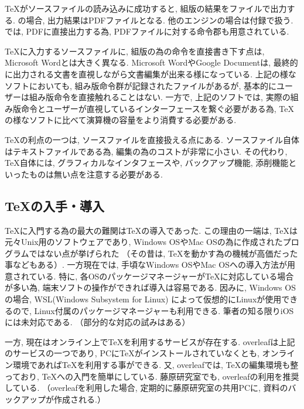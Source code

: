 \documentclass[12pt,xelatex,ja=standard]{bxjsarticle}
\begin{document}
\TeX がソースファイルの読み込みに成功すると,
組版の結果をファイルで出力する.
\XeLaTeX の場合,
出力結果はPDFファイルとなる.
他のエンジンの場合は付録で扱う.
\XeLaTeX では, PDFに直接出力する為,
PDFファイルに対する命令郡も用意されている.

\TeX に入力するソースファイルに,
組版の為の命令を直接書き下す点は,
Microsoft Wordとは大きく異なる.
Microsoft WordやGoogle Documentは,
最終的に出力される文書を直視しながら文書編集が出来る様になっている.
上記の様なソフトにおいても,
組み版命令群が記録されたファイルがあるが,
基本的にユーザーは組み版命令を直接触れることはない.
一方で, 上記のソフトでは,
実際の組み版命令とユーザーが直視しているインターフェースを繋ぐ必要がある為,
\TeX の様なソフトに比べて演算機の容量をより消費する必要がある.

\TeX の利点の一つは,
ソースファイルを直接扱える点にある.
ソースファイル自体はテキストファイルである為,
編集の為のコストが非常に小さい.
その代わり,
\TeX 自体には, グラフィカルなインタフェースや,
バックアップ機能, 添削機能といったものは無い点を注意する必要がある.

\subsection{\TeX の入手・導入}
\TeX に入門する為の最大の難関は\TeX の導入であった.
この理由の一端は,
\TeX は元々Unix用のソフトウェアであり,
Windows OSやMac OSの為に作成されたプログラムではない点が挙げられた
（その昔は, \TeX を動かす為の機械が高価だった事などもある）.
一方現在では,
手頃なWindows OSやMac OSへの導入方法が用意されている.
特に, 各OSのパッケージマネージャーが\TeX に対応している場合が多い為,
端末ソフトの操作ができれば導入は容易である.
因みに, Windows OSの場合,
WSL(Windows Subsystem for Linux)
によって仮想的にLinuxが使用できるので,
Linux付属のパッケージマネージャーも利用できる.
筆者の知る限りiOSには未対応である.
（部分的な対応の試みはある）

一方, 現在はオンライン上で\TeX を利用するサービスが存在する.
overleafは上記のサービスの一つであり,
PCに\TeX がインストールされていなくとも,
オンライン環境であれば\TeX を利用する事ができる.
又, overleafでは,
\TeX の編集環境も整っており,
\TeX への入門を簡単にしている.
藤原研究室でも,
overleafの利用を推奨している.
（overleafを利用した場合,
定期的に藤原研究室の共用PCに,
資料のバックアップが作成される.）
\end{document}
